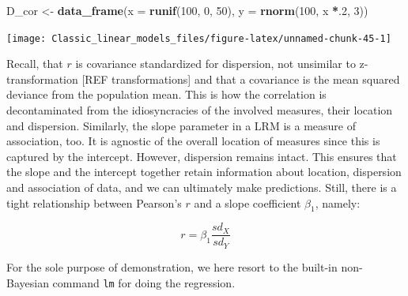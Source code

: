\documentclass[]{svmono}
\newenvironment{Shaded}{\begin{snugshade}}{\end{snugshade}}
\newcommand{\KeywordTok}[1]{\textcolor[rgb]{0.13,0.29,0.53}{\textbf{#1}}}
\newcommand{\DataTypeTok}[1]{\textcolor[rgb]{0.13,0.29,0.53}{#1}}
\newcommand{\DecValTok}[1]{\textcolor[rgb]{0.00,0.00,0.81}{#1}}
\newcommand{\StringTok}[1]{\textcolor[rgb]{0.31,0.60,0.02}{#1}}
\newcommand{\OperatorTok}[1]{\textcolor[rgb]{0.81,0.36,0.00}{\textbf{#1}}}
\newcommand{\NormalTok}[1]{#1}
\begin{document}
\begin{Shaded}
\begin{Highlighting}[]
\NormalTok{D_cor <-}
\StringTok{  }\KeywordTok{data_frame}\NormalTok{(}\DataTypeTok{x =} \KeywordTok{runif}\NormalTok{(}\DecValTok{100}\NormalTok{, }\DecValTok{0}\NormalTok{, }\DecValTok{50}\NormalTok{),}
             \DataTypeTok{y =} \KeywordTok{rnorm}\NormalTok{(}\DecValTok{100}\NormalTok{, x }\OperatorTok{*}\NormalTok{.}\DecValTok{2}\NormalTok{, }\DecValTok{3}\NormalTok{))}
\end{Highlighting}
\end{Shaded}

\begin{Shaded}
\end{Shaded}

\texttt{[image: Classic\_linear\_models\_files/figure-latex/unnamed-chunk-45-1]}

Recall, that \(r\) is covariance standardized for dispersion, not
unsimilar to z-transformation {[}REF transformations{]} and that a
covariance is the mean squared deviance from the population mean. This
is how the correlation is decontaminated from the idiosyncracies of the
involved measures, their location and dispersion. Similarly, the slope
parameter in a LRM is a measure of association, too. It is agnostic of
the overall location of measures since this is captured by the
intercept. However, dispersion remains intact. This ensures that the
slope and the intercept together retain information about location,
dispersion and association of data, and we can ultimately make
predictions. Still, there is a tight relationship between Pearson's
\(r\) and a slope coefficient \(\beta_1\), namely:

\[
r = \beta_1 \frac{sd_X}{sd_Y}
\]

For the sole purpose of demonstration, we here resort to the built-in
non-Bayesian command \texttt{lm} for doing the regression.

\begin{Shaded}
\end{Shaded}
\end{document}
